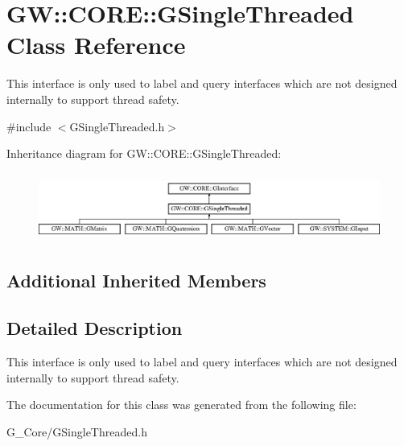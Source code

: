 \hypertarget{class_g_w_1_1_c_o_r_e_1_1_g_single_threaded}{}\section{GW\+:\+:C\+O\+RE\+:\+:G\+Single\+Threaded Class Reference}
\label{class_g_w_1_1_c_o_r_e_1_1_g_single_threaded}


This interface is only used to label and query interfaces which are not designed internally to support thread safety.  




{\ttfamily \#include $<$G\+Single\+Threaded.\+h$>$}

Inheritance diagram for GW\+:\+:C\+O\+RE\+:\+:G\+Single\+Threaded\+:\begin{figure}[H]
\begin{center}
\leavevmode
\includegraphics[height=2.270270cm]{class_g_w_1_1_c_o_r_e_1_1_g_single_threaded}
\end{center}
\end{figure}
\subsection*{Additional Inherited Members}


\subsection{Detailed Description}
This interface is only used to label and query interfaces which are not designed internally to support thread safety. 

The documentation for this class was generated from the following file\+:\begin{DoxyCompactItemize}
\item 
G\+\_\+\+Core/G\+Single\+Threaded.\+h\end{DoxyCompactItemize}
